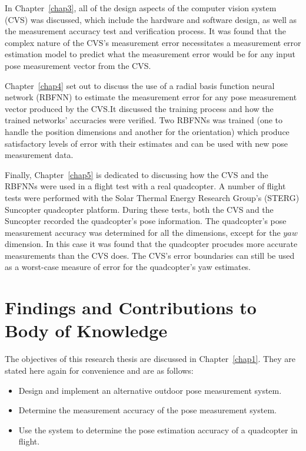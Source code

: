 In Chapter~\ref{chap3}, all of the design aspects of the computer vision system (CVS) was discussed, which include the hardware and software design, as well as the measurement accuracy test and verification process. It was found that the complex nature of the CVS's measurement error necessitates a measurement error estimation model to predict what the measurement error would be for any input pose measurement vector from the CVS.\@ 

Chapter~\ref{chap4} set out to discuss the use of a radial basis function neural network (RBFNN) to estimate the measurement error for any pose measurement vector produced by the CVS.\@ It discussed the training process and how the trained networks' accuracies were verified. Two RBFNNs was trained (one to handle the position dimensions and another for the orientation) which produce satisfactory levels of error with their estimates and can be used with new pose measurement data.

Finally, Chapter~\ref{chap5} is dedicated to discussing how the CVS and the RBFNNs were used in a flight test with a real quadcopter. A number of flight tests were performed with the Solar Thermal Energy Research Group's (STERG) Suncopter quadcopter platform. During these tests, both the CVS and the Suncopter recorded the quadcopter's pose information. The quadcopter's pose measurement accuracy was determined for all the dimensions, except for the $yaw$ dimension. In this case it was found that the quadcopter procudes more accurate measurements than the CVS does. The CVS's error boundaries can still be used as a worst-case measure of error for the quadcopter's yaw estimates. 


\section{Findings and Contributions to Body of Knowledge}

The objectives of this research thesis are discussed in Chapter~\ref{chap1}. They are stated here again for convenience and are as follows:

\begin{itemize}
  \item Design and implement an alternative outdoor pose measurement system.
  \item Determine the measurement accuracy of the pose measurement system.
  \item Use the system to determine the pose estimation accuracy of a quadcopter in flight. 
\end{itemize}

